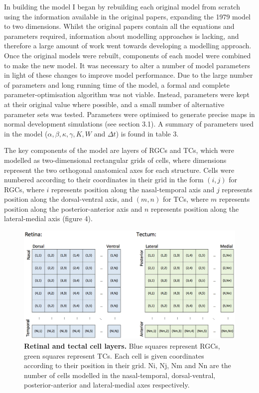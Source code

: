 \documentclass[11pt]{"article"}
\begin{document}
In building the model I began by rebuilding each original model from scratch using the information available in the original papers, expanding the 1979 model to two dimensions. Whilst the original papers contain all the equations and parameters required, information about modelling approaches is lacking, and therefore a large amount of work went towards developing a modelling approach. Once the original models were rebuilt, components of each model were combined to make the new model. It was necessary to alter a number of model parameters in light of these changes to improve model performance. Due to the large number of parameters and long running time of the model, a formal and complete parameter-optimisation algorithm was not viable. Instead, parameters were kept at their original value where possible, and a small number of alternative parameter sets was tested. Parameters were optimised to generate precise maps in normal development simulations (see section 3.1). A summary of parameters used in the model ($\alpha, \beta, \kappa, \gamma, K, W$ and $\Delta t $) is found in table 3.\\

\pagebreak

The key components of the model are layers of RGCs and TCs, which were modelled as two-dimensional rectangular grids of cells, where dimensions represent the two orthogonal anatomical axes for each structure. Cells were numbered according to their coordinates in their grid in the form $(i,j)$ for RGCs, where $i$ represents position along the nasal-temporal axis and $j$ represents position along the dorsal-ventral axis, and $(m,n)$ for TCs, where $m$ represents position along the posterior-anterior axis and $n$ represents position along the lateral-medial axis (figure 4).\\

\vspace*{20pt}

\begin{figure}[!h]
\includegraphics[scale=0.4]{Coordinates}
\setlength{\abovecaptionskip}{20pt}
\caption{\textbf{Retinal and tectal cell layers.}
Blue squares represent RGCs, green squares represent TCs. Each cell is given coordinates according to their position in their grid. Ni, Nj, Nm and Nn are the number of cells modelled in the nasal-temporal, dorsal-ventral, posterior-anterior and lateral-medial axes respectively.}
\end{figure}
\end{document}
